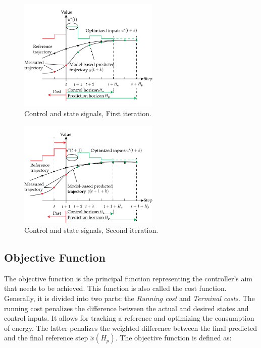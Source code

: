 \begin{figure}[H]
\begin{center}
    \includegraphics[width=0.6\textwidth]{Kap2/mpc1.png}
    \caption{Control and state signals, First iteration.} 
    \label{fig:mpc1}
\end{center}
\end{figure}

\begin{figure}[H]
\begin{center}
    \includegraphics[width=0.6\textwidth]{Kap2/mpc2.png}
    \caption{Control and state signals, Second iteration.}
    \label{fig:mpc2}
\end{center}
\end{figure}




\subsection{Objective Function}

The objective function is the principal function representing the controller's aim that needs to be achieved. This function is also called the cost function. Generally, it is divided into two parts: the \textit{Running cost} and \textit{Terminal costs}. The running cost penalizes the difference between the actual and desired states and control inputs. It allows for tracking a reference and optimizing the consumption of energy. The latter penalizes the weighted difference between the final predicted and the final reference step $\tilde{x}(H_p)$. The objective function is defined as:

